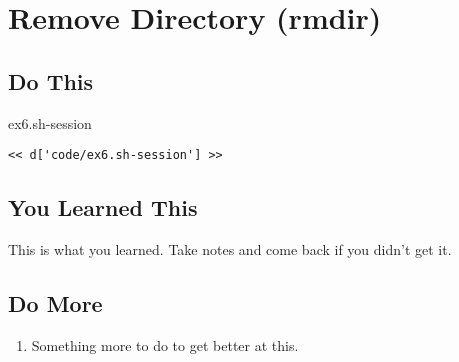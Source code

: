 \chapter{Remove Directory (rmdir)}

\section{Do This}

\begin{code}{ex6.sh-session}
\begin{Verbatim}
<< d['code/ex6.sh-session'] >>
\end{Verbatim}
\end{code}


\section{You Learned This}

This is what you learned.  Take notes and come back if you didn't get it.

\section{Do More}

\begin{enumerate}
\item Something more to do to get better at this.
\end{enumerate}

